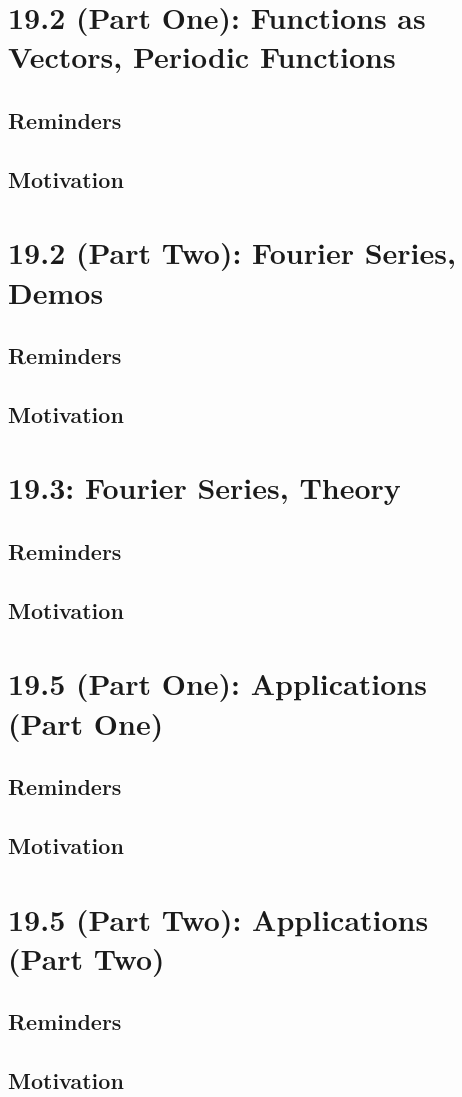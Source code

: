 \documentclass{report}
\begin{document}
\begin{sloppypar}
\chapter{19.2 (Part One): Functions as Vectors, Periodic
  Functions}
\section{Reminders}
\section{Motivation}
\chapter{19.2 (Part Two): Fourier Series, Demos}
\section{Reminders}
\section{Motivation}
\chapter{19.3: Fourier Series, Theory}
\section{Reminders}
\section{Motivation}
\chapter{19.5 (Part One): Applications (Part One)}
\section{Reminders}
\section{Motivation}
\chapter{19.5 (Part Two): Applications (Part Two)}
\section{Reminders}
\section{Motivation}
\end{sloppypar}
\end{document}
